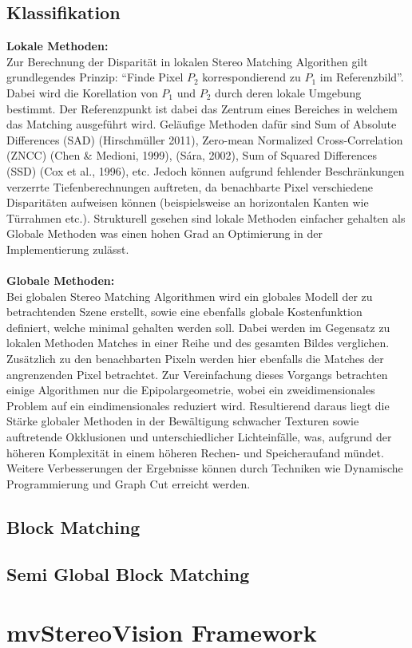 \subsection{Klassifikation}
\label{subsec:stereo_matching_classification}
\textbf{Lokale Methoden:}\\
Zur Berechnung der Disparität in lokalen Stereo Matching Algorithen gilt grundlegendes Prinzip: “Finde Pixel $P_2$ korrespondierend zu $P_1$ im Referenzbild”. Dabei wird die Korellation von $P_1$ und $P_2$ durch deren lokale Umgebung bestimmt. Der Referenzpunkt ist dabei das Zentrum eines Bereiches in welchem das Matching ausgeführt wird. Geläufige Methoden dafür sind Sum of Absolute Differences (SAD) (Hirschmüller 2011), Zero-mean Normalized Cross-Correlation (ZNCC) (Chen \& Medioni, 1999), (Sára, 2002), Sum of Squared Differences (SSD) (Cox et al., 1996), etc.
Jedoch können aufgrund fehlender Beschränkungen verzerrte Tiefenberechnungen auftreten, da benachbarte Pixel verschiedene Disparitäten aufweisen können (beispielsweise an horizontalen Kanten wie Türrahmen etc.). Strukturell gesehen sind lokale Methoden einfacher gehalten als Globale Methoden was einen hohen Grad an Optimierung in der Implementierung zulässt.\\\\
\textbf{Globale Methoden:}\\
Bei globalen Stereo Matching Algorithmen wird ein globales Modell der zu betrachtenden Szene erstellt, sowie eine ebenfalls globale Kostenfunktion definiert, welche minimal gehalten werden soll. Dabei werden im Gegensatz zu lokalen Methoden Matches in einer Reihe und des gesamten Bildes verglichen. Zusätzlich zu den benachbarten Pixeln werden hier ebenfalls die Matches der angrenzenden Pixel betrachtet. Zur Vereinfachung dieses Vorgangs betrachten einige Algorithmen nur die Epipolargeometrie, wobei ein zweidimensionales Problem auf ein eindimensionales reduziert wird. Resultierend daraus liegt die Stärke globaler Methoden in der Bewältigung schwacher Texturen sowie auftretende Okklusionen und unterschiedlicher Lichteinfälle, was, aufgrund der höheren Komplexität in einem höheren Rechen- und Speicheraufand mündet. Weitere Verbesserungen der Ergebnisse können durch Techniken wie Dynamische Programmierung und Graph Cut erreicht werden.

\subsection{Block Matching}
\label{subsec:stereo_matching_bm}

\subsection{Semi Global Block Matching}
\label{subsec:stereo_matching_sgbm}


\section{mvStereoVision Framework}
\label{sec:framework}
